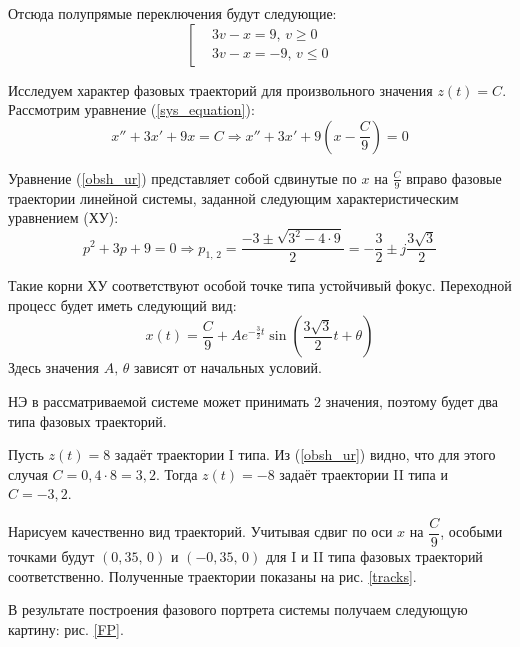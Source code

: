 	Отсюда полупрямые переключения будут следующие:
	\begin{equation}
		\left[\begin{aligned}
			&3v-x = 9,\,v\geq 0 \\
			&3v-x = -9,\,v\leq 0 
		\end{aligned}\right.
		\label{perekl}
	\end{equation}
	
	Исследуем характер фазовых траекторий для произвольного значения $z(t) = C$. Рассмотрим уравнение (\ref{sys_equation}):
	\begin{equation}
		x''+3x'+9x = C \Rightarrow x'' + 3x' + 9\left(x-\frac{C}{9}\right) = 0
		\label{obsh_ur}
	\end{equation}
	 
	Уравнение (\ref{obsh_ur}) представляет собой сдвинутые по $x$ на $\frac{C}{9}$ вправо фазовые траектории линейной системы, заданной следующим характеристическим уравнением (ХУ):
	\begin{equation*}
		p^2 + 3p + 9 = 0 \Rightarrow p_{1,\,2} = \frac{-3\pm\sqrt{3^2 - 4\cdot9}}{2} = -\frac{3}{2} \pm j\frac{3\sqrt{3}}{2}
	\end{equation*}
	
	Такие корни ХУ соответствуют особой точке типа устойчивый фокус. Переходной процесс будет иметь следующий вид:
	\begin{equation*}
		x(t) = \frac{C}{9} + Ae^{-\frac{3}{2}t}\sin(\frac{3\sqrt{3}}{2}t + \theta)
	\end{equation*}
	Здесь значения $A,\,\theta$ зависят от начальных условий.
	
	НЭ в рассматриваемой системе может принимать 2 значения, поэтому будет два типа фазовых траекторий. 
	
	Пусть $z(t) = 8$ задаёт траектории I типа. Из (\ref{obsh_ur}) видно, что для этого случая $C=0,4\cdot8=3,2$. Тогда $z(t) = -8$ задаёт траектории II типа и $C = -3,2$.
	
	Нарисуем качественно вид траекторий. Учитывая сдвиг по оси $x$ на $\dfrac{C}{9}$, особыми точками будут  $\left(0,35,\,0\right)$ и $\left(-0,35,\,0\right)$ для I и II типа фазовых траекторий соответственно. Полученные траектории показаны на рис. \ref{tracks}.
	
	В результате построения фазового портрета системы получаем следующую картину: рис. \ref{FP}.
	
